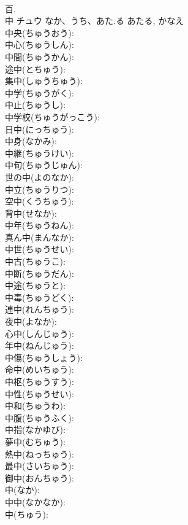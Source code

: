 \documentclass[8pt]{extreport}
\begin{document}
\begin{CJK}{UTF8}{min}
\\	百.
\\	中	チュウ	なか、うち、あた.る	あたる, かなえ	
\\	中央(ちゅうおう): 
\\	中心(ちゅうしん): 
\\	中間(ちゅうかん): 
\\	途中(とちゅう): 
\\	集中(しゅうちゅう): 
\\	中学(ちゅうがく): 
\\	中止(ちゅうし): 
\\	中学校(ちゅうがっこう): 
\\	日中(にっちゅう): 
\\	中身(なかみ): 
\\	中継(ちゅうけい): 
\\	中旬(ちゅうじゅん): 
\\	世の中(よのなか): 
\\	中立(ちゅうりつ): 
\\	空中(くうちゅう): 
\\	背中(せなか): 
\\	中年(ちゅうねん): 
\\	真ん中(まんなか): 
\\	中世(ちゅうせい): 
\\	中古(ちゅうこ): 
\\	中断(ちゅうだん): 
\\	中途(ちゅうと): 
\\	中毒(ちゅうどく): 
\\	連中(れんちゅう): 
\\	夜中(よなか): 
\\	心中(しんじゅう): 
\\	年中(ねんじゅう): 
\\	中傷(ちゅうしょう): 
\\	命中(めいちゅう): 
\\	中枢(ちゅうすう): 
\\	中性(ちゅうせい): 
\\	中和(ちゅうわ): 
\\	中腹(ちゅうふく): 
\\	中指(なかゆび): 
\\	夢中(むちゅう): 
\\	熱中(ねっちゅう): 
\\	最中(さいちゅう): 
\\	御中(おんちゅう): 
\\	中(なか): 
\\	中中(なかなか): 
\\	中(ちゅう): 

\end{CJK}
\end{document}
